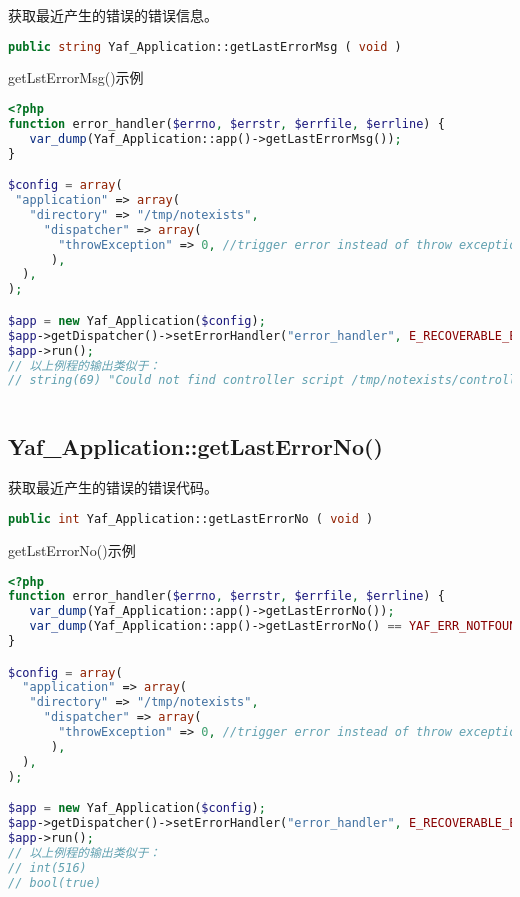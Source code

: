获取最近产生的错误的错误信息。






\begin{lstlisting}[language=PHP]
public string Yaf_Application::getLastErrorMsg ( void )
\end{lstlisting}

\begin{example}
getLstErrorMsg()示例
\begin{lstlisting}[language=PHP]
<?php
function error_handler($errno, $errstr, $errfile, $errline) {
   var_dump(Yaf_Application::app()->getLastErrorMsg());
}

$config = array(                   
 "application" => array(
   "directory" => "/tmp/notexists",
     "dispatcher" => array(
       "throwException" => 0, //trigger error instead of throw exception when error occure
      ),
  ),
);

$app = new Yaf_Application($config);
$app->getDispatcher()->setErrorHandler("error_handler", E_RECOVERABLE_ERROR);
$app->run();
// 以上例程的输出类似于：
// string(69) "Could not find controller script /tmp/notexists/controllers/Index.php"
\end{lstlisting}
\end{example}


\begin{lstlisting}[language=PHP]

\end{lstlisting}


\subsection{Yaf\_Application::getLastErrorNo()}

获取最近产生的错误的错误代码。






\begin{lstlisting}[language=PHP]
public int Yaf_Application::getLastErrorNo ( void )
\end{lstlisting}


\begin{example}
getLstErrorNo()示例
\begin{lstlisting}[language=PHP]
<?php
function error_handler($errno, $errstr, $errfile, $errline) {
   var_dump(Yaf_Application::app()->getLastErrorNo());
   var_dump(Yaf_Application::app()->getLastErrorNo() == YAF_ERR_NOTFOUND_CONTROLLER);
}

$config = array(
  "application" => array(
   "directory" => "/tmp/notexists",
     "dispatcher" => array(
       "throwException" => 0, //trigger error instead of throw exception when error occure
      ),
  ),
);

$app = new Yaf_Application($config);
$app->getDispatcher()->setErrorHandler("error_handler", E_RECOVERABLE_ERROR);
$app->run();
// 以上例程的输出类似于：
// int(516)
// bool(true)
\end{lstlisting}
\end{example}






